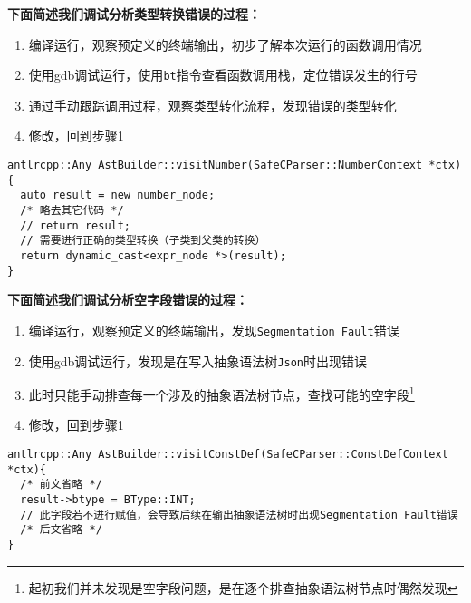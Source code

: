 \documentclass[../main.tex]{subfiles}
\begin{document}
\textbf{下面简述我们调试分析类型转换错误的过程：}

\begin{enumerate}
	\item 编译运行，观察预定义的终端输出，初步了解本次运行的函数调用情况
	\item 使用gdb调试运行，使用\texttt{bt}指令查看函数调用栈，定位错误发生的行号
	\item 通过手动跟踪调用过程，观察类型转化流程，发现错误的类型转化
	\item 修改，回到步骤1
\end{enumerate}

\begin{mdframed}
	\begin{verbatim}
antlrcpp::Any AstBuilder::visitNumber(SafeCParser::NumberContext *ctx) {
  auto result = new number_node;
  /* 略去其它代码 */
  // return result;
  // 需要进行正确的类型转换（子类到父类的转换）
  return dynamic_cast<expr_node *>(result);
}
  \end{verbatim}
\end{mdframed}


\textbf{下面简述我们调试分析空字段错误的过程：}

\begin{enumerate}
	\item 编译运行，观察预定义的终端输出，发现\texttt{Segmentation Fault}错误
	\item 使用gdb调试运行，发现是在写入抽象语法树\texttt{Json}时出现错误
	\item 此时只能手动排查每一个涉及的抽象语法树节点，查找可能的空字段\footnote{起初我们并未发现是空字段问题，是在逐个排查抽象语法树节点时偶然发现}
	\item 修改，回到步骤1
\end{enumerate}

\begin{mdframed}
	\begin{verbatim}
antlrcpp::Any AstBuilder::visitConstDef(SafeCParser::ConstDefContext *ctx){
  /* 前文省略 */
  result->btype = BType::INT;
  // 此字段若不进行赋值，会导致后续在输出抽象语法树时出现Segmentation Fault错误
  /* 后文省略 */
}
  \end{verbatim}
\end{mdframed}
\end{document}
